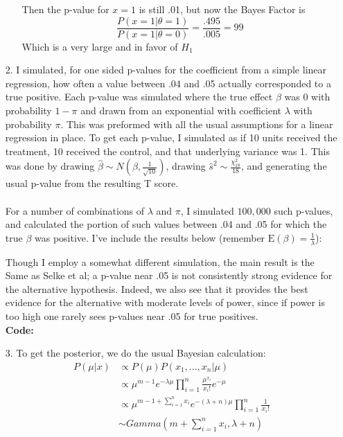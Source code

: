 \documentclass[11pt]{article}
\newcommand{\E}{\mathrm{E}}
\theoremstyle{definition}
\begin{document}
\begin{itemize}
\begin{itemize}
                Then the p-value for $x=1$ is still .01, but now the Bayes Factor is
                \[\frac{P(x=1|\theta=1)}{P(x=1|\theta=0)} =\frac{.495}{.005} = 99\]
                Which is a very large and in favor of $H_1$
        \end{itemize}
    \item[2.]
        I simulated, for one sided p-values for the coefficient from a simple linear regression, how often a value between .04 and .05 actually corresponded to a true positive. Each p-value was simulated where the true effect $\beta$ was 0 with probability $1-\pi$ and drawn from an exponential with coefficient $\lambda$ with probability $\pi$. This was preformed with all the usual assumptions for a linear regression in place. To get each p-value, I simulated as if 10 units received the treatment, 10 received the control, and that underlying variance was 1. This was done by drawing \(\hat\beta\sim N(\beta,\frac{1}{\sqrt{10}})\), drawing \(\hat s^2 \sim \frac{\chi^2_{18}}{18}\), and generating the usual p-value from the resulting T score. \\
        \vspace{0mm} \\
        For a number of combinations of $\lambda$ and $\pi$, I simulated $100,000$ such p-values, and calculated the portion of such values between .04 and .05 for which the true $\beta$ was positive. I've include the results below (remember \(\E(\beta)=\frac{1}{\lambda}\)):
        \FloatBarrier
        
        \FloatBarrier
        Though I employ a somewhat different simulation, the main result is the Same as Selke et al; a p-value near .05 is not consistently strong evidence for the alternative hypothesis. Indeed, we also see that it provides the best evidence for the alternative with moderate levels of power, since if power is too high one rarely sees p-values near .05 for true positives. \\

        {\bf Code:}
        
    
    \item[3.]
        To get the posterior, we do the usual Bayesian calculation:
        \begin{align*}
            P(\mu|x) &\propto P(\mu) P(x_1,...,x_n|\mu) \\
                     &\propto \mu^{m-1}e^{-\lambda \mu} \prod_{i=1}^n \frac{\mu^{x_i}}{x_i!}e^{-\mu} \\
                     &\propto \mu^{m-1+\sum_{i=1}^n x_i}e^{-(\lambda+n) \mu} \prod_{i=1}^n \frac{1}{x_i!} \\
                     &\sim Gamma(m+\sum_{i=1}^n x_i,\lambda+n)
        \end{align*}


\end{itemize}
\end{document}
